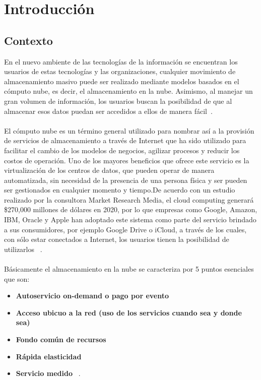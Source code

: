 \chapter{Introducci\'on} %
\label{cha:introduccion}
\section{Contexto}

En el nuevo ambiente de las tecnologías de la información se encuentran los usuarios de estas tecnologías y las organizaciones, cualquier movimiento de almacenamiento masivo puede ser realizado mediante  modelos basados en el cómputo nube, es decir, el almacenamiento en la nube. Asimismo, al manejar un gran volumen de información, los usuarios buscan la posibilidad de que al almacenar esos datos puedan ser accedidos a ellos de manera fácil~\cite{Nubei}. \\ \\ 
El cómputo nube es un término general utilizado para nombrar así a la provisión de servicios de almacenamiento a través de Internet que ha sido utilizado para facilitar el cambio de los modelos de negocios, agilizar procesos y reducir los costos de operación. Uno de los mayores beneficios que ofrece este servicio es la virtualización de los centros de datos, que pueden operar de manera automatizada, sin  necesidad de la presencia de una persona física y ser pueden ser gestionados en cualquier momento y tiempo.De acuerdo con un estudio realizado por la consultora Market Research Media, el cloud computing generará \$270,000 millones de dólares en 2020, por lo que empresas como Google, Amazon, IBM, Oracle y Apple han adoptado este sistema como parte del servicio brindado a sus consumidores, por ejemplo Google Drive o iCloud, a través de los cuales, con sólo estar conectados a Internet, los usuarios tienen la posibilidad de utilizarlos ~\cite{Nubecomp}. \\ \\ Básicamente el almacenamiento en la nube se caracteriza por 5 puntos esenciales que son: 
	\begin{itemize}
		\item \textbf{Autoservicio on-demand o pago por evento}  
		\item \textbf{Acceso ubicuo a la red (uso de los servicios cuando sea y donde sea)}  
		\item \textbf{Fondo común de recursos} 
		\item \textbf{Rápida elasticidad} 
 		\item \textbf{Servicio medido}  ~\cite{Compnube}.
 \end{itemize}

